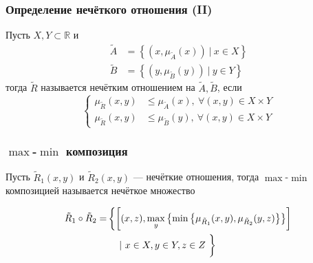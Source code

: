 \documentclass{beamer}
\begin{document}
\begin{frame}\frametitle{Определение нечёткого отношения (II)}
    \begin{definition}
        Пусть $X, Y \subset \mathbb{R}$ и
        \begin{equation*}
            \begin{align}
                \tilde{A} &= \left\{ (x, \mu_{\tilde{A}}(x))\ |\ x \in X \right\} \\
                \tilde{B} &= \left\{ (y, \mu_{\tilde{B}}(y))\ |\ y \in Y \right\}
            \end{align}
        \end{equation*}
        тогда $\tilde{R}$ называется нечётким отношением на $\tilde{A}, \tilde{B}$, если
        \begin{equation*}
            \left\{
                \begin{align}
                    \mu_{\tilde{R}}(x, y) &\leq \mu_{\tilde{A}}(x),\ \forall (x,y) \in X \times Y \\
                    \mu_{\tilde{R}}(x, y) &\leq \mu_{\tilde{B}}(y),\ \forall (x,y) \in X \times Y
                \end{align}
            \right.
        \end{equation*}
    \end{definition}
\end{frame}

\begin{frame}\frametitle{$\max$-$\min$ композиция}

    \begin{definition}
        Пусть $\tilde{R}_1(x,y)$ и $\tilde{R}_2(x,y)$ --- нечёткие отношения, тогда $\max$-$\min$ композицией называется нечёткое множество
        
        \begin{equation*}
            \begin{align}
               \tilde{R}_1 \circ \tilde{R}_2 = & \left\{ \left[ (x, z), \max_{y}\left\{ \min\left\{ \mu_{\tilde{R}_1}(x, y), 
                                                           \mu_{\tilde{R}_2}(y, z) \right\} \right\} \right] \right. \\
                & \left.\ \ \ |\ x \in X, y\in Y, z \in Z \vphantom{\int}\ \right\}
            \end{align}
        \end{equation*}
        
    \end{definition}
\end{frame}
\end{document}
